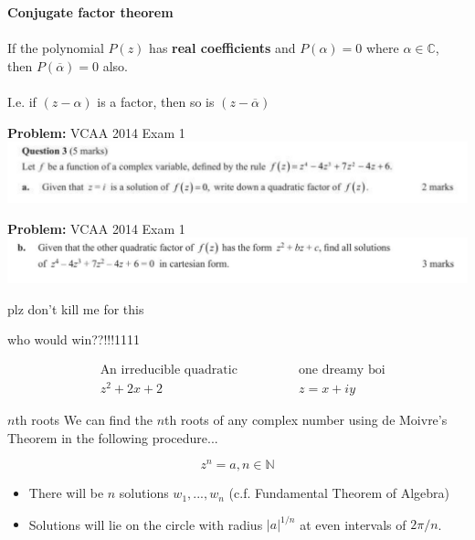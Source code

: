 \documentclass{beamer}
\begin{document}
\begin{frame}
	\textbf{Conjugate factor theorem}\\~\\
	If the polynomial $P(z)$ has \textbf{real coefficients} and $P(\alpha) = 0$ where $\alpha \in \mathbb{C}$, then $P(\overline{\alpha}) = 0$ also.\\~\\
	I.e. if $(z - \alpha)$ is a factor, then so is $(z - \overline{\alpha})$
\end{frame}

\begin{frame}
	\textbf{Problem: } VCAA 2014 Exam 1
	\includegraphics[width=\linewidth]{img/q3a.png}
	\vspace{4cm}
\end{frame}

\begin{frame}
	\textbf{Problem: } VCAA 2014 Exam 1
	\includegraphics[width=\linewidth]{img/q3b.png}
	\vspace{4cm}
\end{frame}

\begin{frame}{plz don't kill me for this}
	\begin{center} who would win??!!!1111 \end{center}

	\begin{align*}
		&\text{An irreducible quadratic}\quad\quad\quad\quad&\text{one dreamy boi}\\
		& z^2 + 2x + 2 & z = x + iy
	\end{align*}	
\end{frame}

\begin{frame}{$n$th roots}
	We can find the $n$th roots of any complex number using de Moivre's Theorem in the following procedure...
	
	$$z^n = a, n \in \mathbb{N}$$
	
	\begin{itemize}
		\item There will be $n$ solutions $w_1, ..., w_n$ (c.f. Fundamental Theorem of Algebra)
		\item Solutions will lie on the circle with radius $|a|^{1/n}$ at even intervals of $2\pi/n$.
	\end{itemize}
\end{frame}
\end{document}
